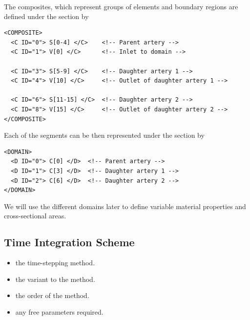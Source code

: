 The composites, which represent groups of elements and boundary regions are defined under the section  by
\begin{lstlisting}[style=XmlStyle]
<COMPOSITE>
  <C ID="0"> S[0-4] </C>	<!-- Parent artery -->
  <C ID="1"> V[0] </C>		<!-- Inlet to domain -->

  <C ID="3"> S[5-9] </C>	<!-- Daughter artery 1 -->
  <C ID="4"> V[10] </C>		<!-- Outlet of daughter artery 1 -->

  <C ID="6"> S[11-15] </C>	<!-- Daughter artery 2 -->
  <C ID="8"> V[15] </C>		<!-- Outlet of daughter artery 2 -->
</COMPOSITE>
\end{lstlisting}

Each of the segments can be then represented under the section  by
\begin{lstlisting}[style=XmlStyle]
<DOMAIN>
  <D ID="0"> C[0] </D>	<!-- Parent artery -->
  <D ID="1"> C[3] </D>	<!-- Daughter artery 1 -->
  <D ID="2"> C[6] </D>	<!-- Daughter artery 2 -->
</DOMAIN>
\end{lstlisting}

We will use the different domains later to define variable material properties and cross-sectional areas.

\subsection{Time Integration Scheme}

\begin{itemize}
\item {} the time-stepping method.
\item {} the variant to the method. 
\item {} the order of the method.
\item {} any free parameters required.
\end{itemize}

